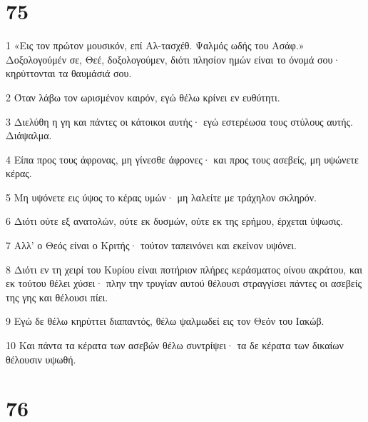 \chapter{75}

\par 1 «Εις τον πρώτον μουσικόν, επί Αλ-τασχέθ. Ψαλμός ωδής του Ασάφ.» Δοξολογούμέν σε, Θεέ, δοξολογούμεν, διότι πλησίον ημών είναι το όνομά σου· κηρύττονται τα θαυμάσιά σου.
\par 2 Όταν λάβω τον ωρισμένον καιρόν, εγώ θέλω κρίνει εν ευθύτητι.
\par 3 Διελύθη η γη και πάντες οι κάτοικοι αυτής· εγώ εστερέωσα τους στύλους αυτής. Διάψαλμα.
\par 4 Είπα προς τους άφρονας, μη γίνεσθε άφρονες· και προς τους ασεβείς, μη υψώνετε κέρας.
\par 5 Μη υψόνετε εις ύψος το κέρας υμών· μη λαλείτε με τράχηλον σκληρόν.
\par 6 Διότι ούτε εξ ανατολών, ούτε εκ δυσμών, ούτε εκ της ερήμου, έρχεται ύψωσις.
\par 7 Αλλ' ο Θεός είναι ο Κριτής· τούτον ταπεινόνει και εκείνον υψόνει.
\par 8 Διότι εν τη χειρί του Κυρίου είναι ποτήριον πλήρες κεράσματος οίνου ακράτου, και εκ τούτου θέλει χύσει· πλην την τρυγίαν αυτού θέλουσι στραγγίσει πάντες οι ασεβείς της γης και θέλουσι πίει.
\par 9 Εγώ δε θέλω κηρύττει διαπαντός, θέλω ψαλμωδεί εις τον Θεόν του Ιακώβ.
\par 10 Και πάντα τα κέρατα των ασεβών θέλω συντρίψει· τα δε κέρατα των δικαίων θέλουσιν υψωθή.

\chapter{76}

